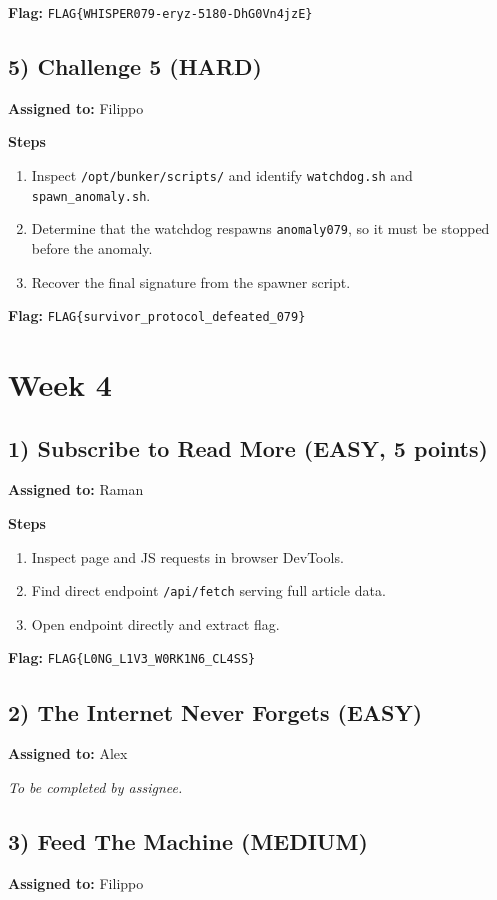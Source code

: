\documentclass[10pt,a4paper]{article}
\begin{document}
\textbf{Flag:} \texttt{FLAG\{WHISPER079-eryz-5180-DhG0Vn4jzE\}}

\subsection*{5) Challenge 5 (HARD)}
\textbf{Assigned to:} Filippo

\textbf{Steps}
\begin{enumerate}[leftmargin=*,noitemsep]
  \item Inspect \texttt{/opt/bunker/scripts/} and identify \texttt{watchdog.sh} and \texttt{spawn\_anomaly.sh}.
  \item Determine that the watchdog respawns \texttt{anomaly079}, so it must be stopped before the anomaly.
  \item Recover the final signature from the spawner script.
\end{enumerate}

\textbf{Flag:} \texttt{FLAG\{survivor\_protocol\_defeated\_079\}}


\section{Week 4}

\subsection*{1) Subscribe to Read More (EASY, 5 points)}
\textbf{Assigned to:} Raman

\textbf{Steps}
\begin{enumerate}[leftmargin=*,noitemsep]
  \item Inspect page and JS requests in browser DevTools.
  \item Find direct endpoint \texttt{/api/fetch} serving full article data.
  \item Open endpoint directly and extract flag.
\end{enumerate}

\textbf{Flag:} \texttt{FLAG\{L0NG\_L1V3\_W0RK1N6\_CL4SS\}}

\subsection*{2) The Internet Never Forgets (EASY)}
\textbf{Assigned to:} Alex

\textit{To be completed by assignee.}

\subsection*{3) Feed The Machine (MEDIUM)}
\textbf{Assigned to:} Filippo
\end{document}
